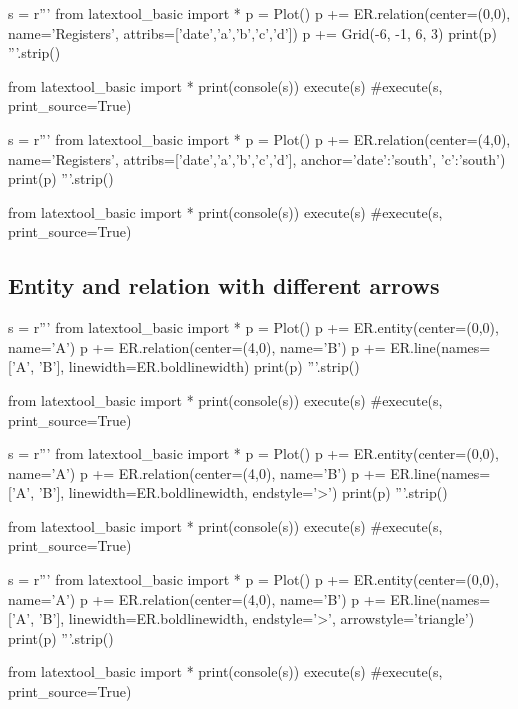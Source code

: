 \begin{python}
s = r'''
from latextool_basic import *
p = Plot()
p += ER.relation(center=(0,0),
                 name='Registers',
                 attribs=['date','a','b','c','d'])
p += Grid(-6, -1, 6, 3)
print(p)
'''.strip()

from latextool_basic import *
print(console(s))
execute(s)
#execute(s, print_source=True)
\end{python}

\begin{python}
s = r'''
from latextool_basic import *
p = Plot()
p += ER.relation(center=(4,0),
                 name='Registers',
                 attribs=['date','a','b','c','d'],
                 anchor={'date':'south', 'c':'south'})
print(p)
'''.strip()

from latextool_basic import *
print(console(s))
execute(s)
#execute(s, print_source=True)
\end{python}



\newpage
\subsection{Entity and relation with different arrows}
\begin{python}
s = r'''
from latextool_basic import *
p = Plot()
p += ER.entity(center=(0,0), name='A')
p += ER.relation(center=(4,0), name='B')
p += ER.line(names=['A', 'B'],
             linewidth=ER.boldlinewidth)
print(p)
'''.strip()

from latextool_basic import *
print(console(s))
execute(s)
#execute(s, print_source=True)
\end{python}

\begin{python}
s = r'''
from latextool_basic import *
p = Plot()
p += ER.entity(center=(0,0), name='A')
p += ER.relation(center=(4,0), name='B')
p += ER.line(names=['A', 'B'],
             linewidth=ER.boldlinewidth, endstyle='>')
print(p)
'''.strip()

from latextool_basic import *
print(console(s))
execute(s)
#execute(s, print_source=True)
\end{python}

\begin{python}
s = r'''
from latextool_basic import *
p = Plot()
p += ER.entity(center=(0,0), name='A')
p += ER.relation(center=(4,0), name='B')
p += ER.line(names=['A', 'B'],
             linewidth=ER.boldlinewidth, endstyle='>',
             arrowstyle='triangle')
print(p)
'''.strip()

from latextool_basic import *
print(console(s))
execute(s)
#execute(s, print_source=True)
\end{python}

